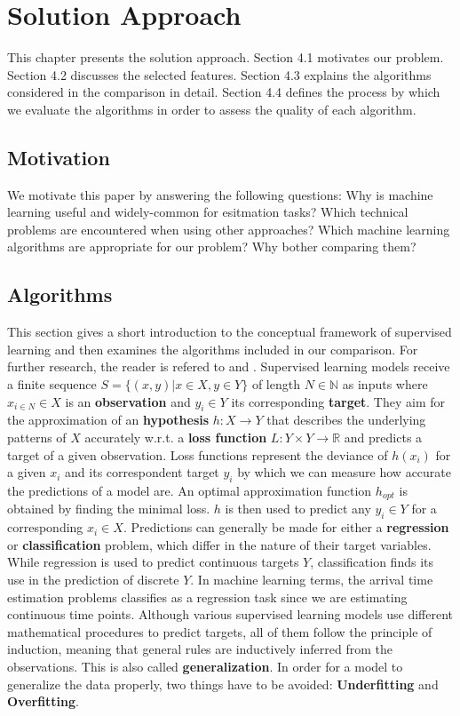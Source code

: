 

\chapter{Solution Approach}
This chapter presents the solution approach.
Section 4.1 motivates our problem. 
Section 4.2 discusses the selected features.
Section 4.3 explains the algorithms considered in the comparison in detail.
Section 4.4 defines the process by which we evaluate the algorithms in order to assess the quality of each algorithm.

\section{Motivation}

We motivate this paper by answering the following questions:
Why is machine learning useful and widely-common for esitmation tasks? 
Which technical problems are encountered when using other approaches? 
Which machine learning algorithms are appropriate for our problem? Why bother comparing them? 

\section{Algorithms}
This section gives a short introduction to the conceptual framework of supervised learning and then examines the algorithms included in our comparison. For further research, the reader is refered to \cite{Bishop} and \cite{SLFoundations}.
\newline
\newline
Supervised learning models receive a finite sequence 
$S = \{(x, y) | x \in X, y \in Y\}$ of length $N \in \mathbb{N}$ as inputs where $x_{i \in N}\in X$ is an \textbf{observation} and $y_i \in Y$ its corresponding \textbf{target}. They aim for the approximation of an \textbf{hypothesis} $h: X \to Y$ that describes the underlying patterns of $X$ accurately w.r.t. a \textbf{loss function} $L: Y \times Y \to \mathbb{R}$ and predicts a target of a given observation. Loss functions represent the deviance of $h(x_i)$ for a given $x_i$ and its correspondent target $y_i$ by which we can measure how accurate the predictions of a model are. An optimal approximation function $h_{opt}$ is obtained by finding the minimal loss. $h$ is then used to predict any $y_i \in Y$ for a corresponding $x_i \in X$.  
\newline
Predictions can generally be made for either a \textbf{regression} or \textbf{classification} problem, which differ in the nature of their target variables. While regression is used to predict continuous targets $Y$, classification finds its use in the prediction of discrete $Y$. In machine learning terms, the arrival time estimation problems classifies as a regression task since we are estimating continuous time points. 
Although various supervised learning models use different mathematical procedures to predict targets, all of them follow the principle of induction, meaning that general rules are inductively inferred from the  observations. This is also called \textbf{generalization}.  
In order for a model to generalize the data properly, two things have to be avoided: \textbf{Underfitting} and \textbf{Overfitting}.


